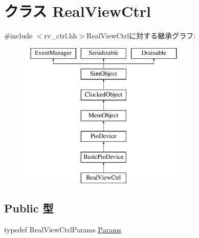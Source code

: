 \hypertarget{classRealViewCtrl}{
\section{クラス RealViewCtrl}
\label{classRealViewCtrl}
}


{\ttfamily \#include $<$rv\_\-ctrl.hh$>$}RealViewCtrlに対する継承グラフ:\begin{figure}[H]
\begin{center}
\leavevmode
\includegraphics[height=7cm]{classRealViewCtrl}
\end{center}
\end{figure}
\subsection*{Public 型}
\begin{DoxyCompactItemize}
\item 
typedef RealViewCtrlParams \hyperlink{classRealViewCtrl_a7bb0551c15e75a5df04d65454bcb45dc}{Params}
\end{DoxyCompactItemize}
